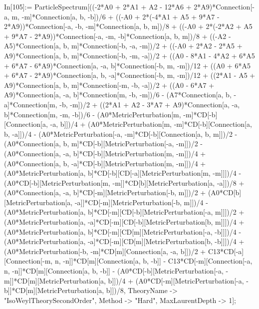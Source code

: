 In[105]:= ParticleSpectrum[((-2*A0 + 2*A1 + A2 - 12*A6 + 2*A9)*Connection[-a, m, -m]*Connection[a, b, -b])/6 + ((-A0 + 2*(-4*A1 + A5 + 9*A7 - 2*A9))*Connection[-a, -b, -m]*Connection[a, b, m])/8 + ((-A0 + 2*(-2*A2 + A5 + 9*A7 - 2*A9))*Connection[-a, -m, -b]*Connection[a, b, m])/8 + ((-A2 - A5)*Connection[a, b, m]*Connection[-b, -a, -m])/2 + ((-A0 + 2*A2 - 2*A5 + A9)*Connection[a, b, m]*Connection[-b, -m, -a])/2 + ((A0 - 8*A1 - 4*A2 + 6*A5 + 6*A7 - 6*A9)*Connection[a, -a, b]*Connection[-b, m, -m])/12 + ((A0 + 6*A5 + 6*A7 - 2*A9)*Connection[a, b, -a]*Connection[-b, m, -m])/12 + ((2*A1 - A5 + A9)*Connection[a, b, m]*Connection[-m, -b, -a])/2 + ((A0 - 6*A7 + A9)*Connection[a, -a, b]*Connection[m, -b, -m])/6 - (A7*Connection[a, b, -a]*Connection[m, -b, -m])/2 + ((2*A1 + A2 - 3*A7 + A9)*Connection[a, -a, b]*Connection[m, -m, -b])/6 - (A0*MetricPerturbation[m, -m]*CD[-b][Connection[a, -a, b]])/4 + (A0*MetricPerturbation[m, -m]*CD[-b][Connection[a, b, -a]])/4 - (A0*MetricPerturbation[-a, -m]*CD[-b][Connection[a, b, m]])/2 - (A0*Connection[a, b, m]*CD[-b][MetricPerturbation[-a, -m]])/2 - (A0*Connection[a, -a, b]*CD[-b][MetricPerturbation[m, -m]])/4 + (A0*Connection[a, b, -a]*CD[-b][MetricPerturbation[m, -m]])/4 + (A0*MetricPerturbation[a, b]*CD[-b][CD[-a][MetricPerturbation[m, -m]]])/4 - (A0*CD[-b][MetricPerturbation[m, -m]]*CD[b][MetricPerturbation[a, -a]])/8 + (A0*Connection[a, -a, b]*CD[-m][MetricPerturbation[-b, m]])/2 + (A0*CD[b][MetricPerturbation[a, -a]]*CD[-m][MetricPerturbation[-b, m]])/4 - (A0*MetricPerturbation[a, b]*CD[-m][CD[-b][MetricPerturbation[-a, m]]])/2 + (A0*MetricPerturbation[a, -a]*CD[-m][CD[-b][MetricPerturbation[b, m]]])/4 + (A0*MetricPerturbation[a, b]*CD[-m][CD[m][MetricPerturbation[-a, -b]]])/4 - (A0*MetricPerturbation[a, -a]*CD[-m][CD[m][MetricPerturbation[b, -b]]])/4 + (A0*MetricPerturbation[-b, -m]*CD[m][Connection[a, -a, b]])/2 + C13*CD[-a][Connection[-m, n, -n]]*CD[m][Connection[a, b, -b]] - C13*CD[-m][Connection[-a, n, -n]]*CD[m][Connection[a, b, -b]] - (A0*CD[-b][MetricPerturbation[-a, -m]]*CD[m][MetricPerturbation[a, b]])/4 + (A0*CD[-m][MetricPerturbation[-a, -b]]*CD[m][MetricPerturbation[a, b]])/8, TheoryName -> "IsoWeylTheorySecondOrder", Method -> "Hard", MaxLaurentDepth -> 1]; 
